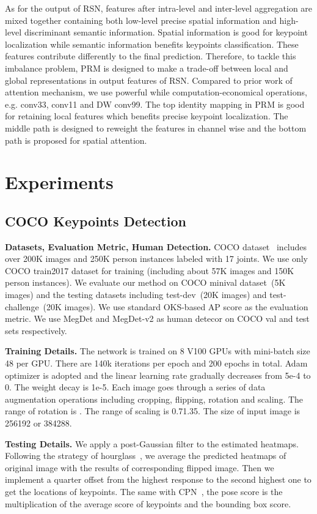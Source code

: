 \documentclass[runningheads]{llncs}
\begin{document}
As for the output of RSN, features after intra-level and inter-level aggregation are mixed together containing both low-level precise spatial information and high-level discriminant semantic information. Spatial information is good for keypoint localization while semantic information benefits keypoints classification. These features contribute differently to the final prediction. Therefore, to tackle this imbalance problem, PRM is designed to make a trade-off between local and global representations in output features of RSN. Compared to prior work of attention mechanism, we use powerful while computation-economical operations, e.g. conv33, conv11 and DW conv99.  The top identity mapping in PRM is good for retaining local features which benefits precise keypoint localization. The middle path is designed to reweight the features in channel wise and the bottom path is proposed for spatial attention.






\section{Experiments} \label{sec:experiment}
\subsection{COCO Keypoints Detection}\label{sec:coco}
\textbf{Datasets, Evaluation Metric, Human Detection.} COCO dataset~\cite{hrnet36} includes over 200K images and 250K person instances labeled with 17 joints. We use only COCO train2017 dataset for training (including about 57K images and 150K person instances). We evaluate our method on COCO minival dataset~(5K images) and the testing datasets including test-dev~(20K images) and test-challenge~(20K images). We use standard OKS-based AP score as the evaluation metric. We use MegDet and MegDet-v2 as human detecor on COCO val and test sets respectively.

\textbf{Training Details.} The network is trained on 8 V100 GPUs with mini-batch size 48 per GPU. There are 140k iterations per epoch and 200 epochs in total. Adam optimizer is adopted and the linear learning rate gradually decreases from 5e-4 to 0. The weight decay is 1e-5. Each image goes through a series of data augmentation operations including cropping, flipping, rotation and scaling. The range of rotation is . The range of scaling is 0.71.35. The size of input image is 256192 or 384288.

\textbf{Testing Details.} We apply a post-Gaussian filter to the estimated heatmaps. Following the strategy of hourglass~\cite{hourglass}, we average the predicted heatmaps of original image with the results of corresponding flipped image. Then we implement a quarter offset from the highest response to the second highest one to get the locations of keypoints. The same with CPN~\cite{cpn}, the pose score is the multiplication of the average score of keypoints and the bounding box score.
\end{document}
